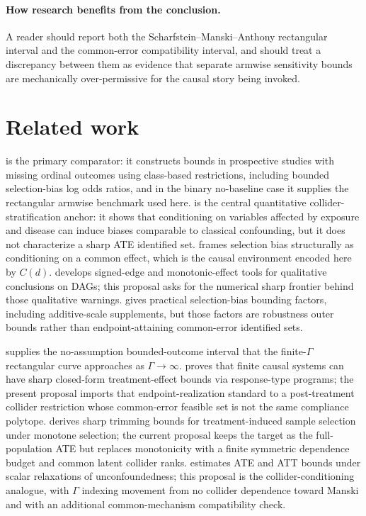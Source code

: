 \documentclass[11pt]{article}
\theoremstyle{definition}
\theoremstyle{plain}
\theoremstyle{remark}
\begin{document}
\paragraph{How research benefits from the conclusion.}
A reader should report both the Scharfstein--Manski--Anthony rectangular interval and the common-error compatibility interval, and should treat a discrepancy between them as evidence that separate armwise sensitivity bounds are mechanically over-permissive for the causal story being invoked.

\section{Related work}
\citet{ScharfsteinManskiAnthony2004Bounds} is the primary comparator: it constructs bounds in prospective studies with missing ordinal outcomes using class-based restrictions, including bounded selection-bias log odds ratios, and in the binary no-baseline case it supplies the rectangular armwise benchmark used here.  \citet{Greenland2003ColliderBias} is the central quantitative collider-stratification anchor: it shows that conditioning on variables affected by exposure and disease can induce biases comparable to classical confounding, but it does not characterize a sharp ATE identified set.  \citet{HernanHernandezDiazRobins2004Selection} frames selection bias structurally as conditioning on a common effect, which is the causal environment encoded here by \(C(d)\).  \citet{VanderWeeleRobins2009MonotonicEffects} develops signed-edge and monotonic-effect tools for qualitative conclusions on DAGs; this proposal asks for the numerical sharp frontier behind those qualitative warnings.  \citet{SmithVanderWeele2019Selection} gives practical selection-bias bounding factors, including additive-scale supplements, but those factors are robustness outer bounds rather than endpoint-attaining common-error identified sets.

\citet{Manski1990NonparametricBounds} supplies the no-assumption bounded-outcome interval that the finite-\(\Gamma\) rectangular curve approaches as \(\Gamma\to\infty\).  \citet{BalkePearl1997Bounds} proves that finite causal systems can have sharp closed-form treatment-effect bounds via response-type programs; the present proposal imports that endpoint-realization standard to a post-treatment collider restriction whose common-error feasible set is not the same compliance polytope.  \citet{Lee2009SampleSelection} derives sharp trimming bounds for treatment-induced sample selection under monotone selection; the current proposal keeps the target as the full-population ATE but replaces monotonicity with a finite symmetric dependence budget and common latent collider ranks.  \citet{MastenPoirierZhang2024Sensitivity} estimates ATE and ATT bounds under scalar relaxations of unconfoundedness; this proposal is the collider-conditioning analogue, with \(\Gamma\) indexing movement from no collider dependence toward Manski and with an additional common-mechanism compatibility check.
\end{document}
